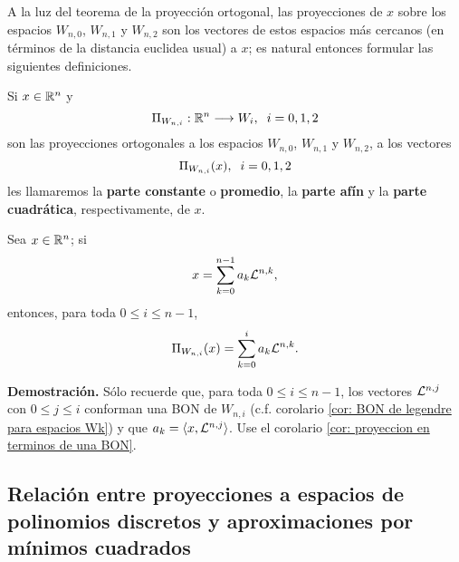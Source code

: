 \noindent A la luz del teorema de la proyección ortogonal, 
las proyecciones de $x$ sobre los espacios 
$W_{n,0}$, $W_{n,1}$
y $W_{n,2}$ son los vectores
de estos espacios más cercanos (en términos de la 
distancia euclidea usual)
a $x$; es natural entonces formular
las siguientes definiciones.


\begin{defi}
Si $x \in \mathbb{R}^{n}$ y
\begin{equation}
\label{eq0: 5Dic}
\Pi_{W_{n,i}}: \mathbb{R} ^{n}  \longrightarrow W_{i}, \hspace{0.2cm}
i=0,1,2
\end{equation}
son las proyecciones ortogonales
a los espacios 
$W_{n,0}$, $W_{n,1}$ y $W_{n,2}$, a los vectores
\[
\Pi_{W_{n,i}}(x), \hspace{0.2cm} i=0,1,2
\]
les llamaremos la \textbf{parte constante}
o \textbf{promedio}, la \textbf{parte afín} y la
\textbf{parte cuadrática}, respectivamente, de $x$.
\end{defi}

\begin{prop}
Sea $x \in \mathbb{R}^{n}$; si
\[
x= \sum\limits_{k=0}^{n-1}a_{k}\mathcal{L}^{n,k},
\]
entonces, para toda $0 \leq i \leq n-1$,
\[
\Pi_{W_{n,i}}(x)=\sum\limits_{k=0}^{i}a_{k}\mathcal{L}^{n,k}.
\]
\end{prop}
\textbf{Demostración.}
Sólo recuerde que, para toda $0 \leq i \leq n-1$,
los vectores $\mathcal{L}^{n, j}$ con $0 \leq j \leq i$
conforman una BON de $W_{n,i}$
(c.f. corolario \ref{cor: BON de legendre para espacios Wk}) y
que $a_{k}= \langle x, \mathcal{L}^{n,j} \rangle$.
Use el corolario \ref{cor: proyeccion en terminos de una BON}.
\QEDB 
\vspace{0.2cm}










\subsection{Relación entre proyecciones a espacios de polinomios discretos y aproximaciones por mínimos cuadrados}
\label{Relación entre proyecciones a espacios de polinomios discretos y aproximaciones por mínimos cuadrados}

